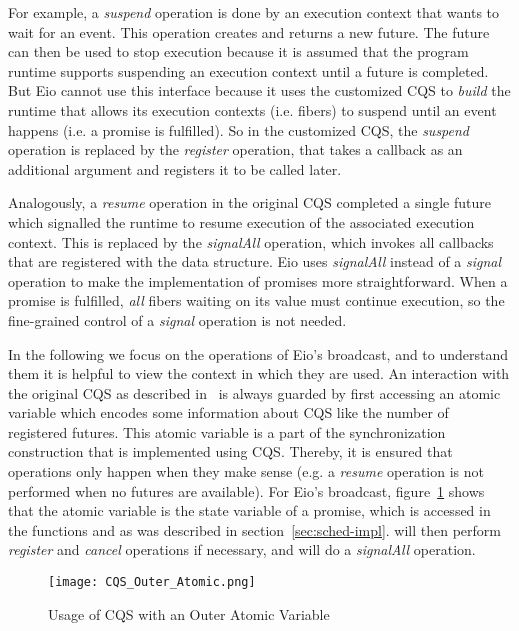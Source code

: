 For example, a \emph{suspend} operation is done by an execution context that wants to wait for an event.
This operation creates and returns a new future.
The future can then be used to stop execution because it is assumed that the program runtime supports suspending an execution context until a future is completed.
But Eio cannot use this interface because it uses the customized CQS to \emph{build} the runtime that allows its execution contexts (i.e. fibers) to suspend until an event happens (i.e. a promise is fulfilled).
So in the customized CQS, the \emph{suspend} operation is replaced by the \emph{register} operation, that takes a callback as an additional argument and registers it to be called later.

Analogously, a \emph{resume} operation in the original CQS completed a single future which signalled the runtime to resume execution of the associated execution context.
This is replaced by the \emph{signalAll} operation, which invokes all callbacks that are registered with the data structure.
Eio uses \emph{signalAll} instead of a \emph{signal} operation to make the implementation of promises more straightforward.
When a promise is fulfilled, \emph{all} fibers waiting on its value must continue execution, so the fine-grained control of a \emph{signal} operation is not needed.


In the following we focus on the operations of Eio's broadcast, and to understand them it is helpful to view the context in which they are used.
An interaction with the original CQS as described in~\cite{koval2023cqs} is always guarded by first accessing an atomic variable which encodes some information about CQS like the number of registered futures.
This atomic variable is a part of the synchronization construction that is implemented using CQS.
Thereby, it is ensured that operations only happen when they make sense (e.g. a \emph{resume} operation is not performed when no futures are available).
For Eio's broadcast, figure~\ref{fig:cqs-usage} shows that the atomic variable is the state variable of a promise, which is accessed in the functions  and  as was described in section~\ref{sec:sched-impl}.
 will then perform \emph{register} and \emph{cancel} operations if necessary, and  will do a \emph{signalAll} operation.

\begin{figure}[ht]
  \texttt{[image: CQS\_Outer\_Atomic.png]}
  \caption{Usage of CQS with an Outer Atomic Variable}
  \label{fig:cqs-usage}
\end{figure}

